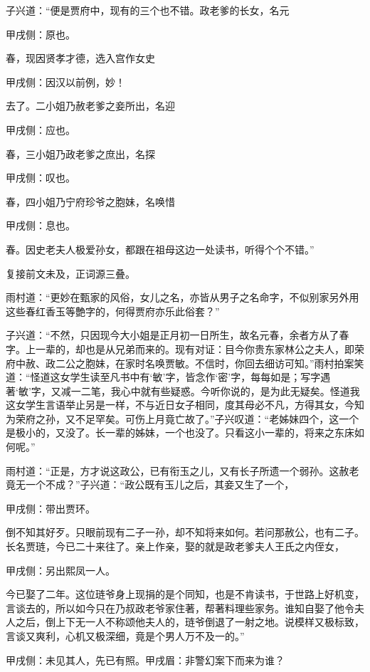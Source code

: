 \begin{parag}
    子兴道：“便是贾府中，现有的三个也不错。政老爹的长女，名元\begin{note}甲戌侧：原也。\end{note}春，现因贤孝才德，选入宫作女史\begin{note}甲戌侧：因汉以前例，妙！\end{note}去了。二小姐乃赦老爹之妾所出，名迎\begin{note}甲戌侧：应也。\end{note}春，三小姐乃政老爹之庶出，名探\begin{note}甲戌侧：叹也。\end{note}春，四小姐乃宁府珍爷之胞妹，名唤惜\begin{note}甲戌侧：息也。\end{note}春。因史老夫人极爱孙女，都跟在祖母这边一处读书，听得个个不错。”\begin{note}复接前文未及，正词源三叠。\end{note}雨村道：“更妙在甄家的风俗，女儿之名，亦皆从男子之名命字，不似别家另外用这些春红香玉等艶字的，何得贾府亦乐此俗套？”
\end{parag}


\begin{parag}
    子兴道：“不然，只因现今大小姐是正月初一日所生，故名元春，余者方从了春字。上一辈的，却也是从兄弟而来的。现有对证：目今你贵东家林公之夫人，即荣府中赦、政二公之胞妹，在家时名唤贾敏。不信时，你回去细访可知。”雨村拍案笑道：“怪道这女学生读至凡书中有‘敏’字，皆念作‘密’字，每每如是；写字遇著‘敏’字，又减一二笔，我心中就有些疑惑。今听你说的，是为此无疑矣。怪道我这女学生言语举止另是一样，不与近日女子相同，度其母必不凡，方得其女，今知为荣府之孙，又不足罕矣。可伤上月竟亡故了。”子兴叹道：“老姊妹四个，这一个是极小的，又没了。长一辈的姊妹，一个也没了。只看这小一辈的，将来之东床如何呢。”
\end{parag}


\begin{parag}
    雨村道：“正是，方才说这政公，已有衔玉之儿，又有长子所遗一个弱孙。这赦老竟无一个不成？”子兴道：“政公既有玉儿之后，其妾又生了一个，\begin{note}甲戌侧：带出贾环。\end{note}倒不知其好歹。只眼前现有二子一孙，却不知将来如何。若问那赦公，也有二子。长名贾琏，今已二十来往了。亲上作亲，娶的就是政老爹夫人王氏之内侄女，\begin{note}甲戌侧：另出熙凤一人。\end{note}今已娶了二年。这位琏爷身上现捐的是个同知，也是不肯读书，于世路上好机变，言谈去的，所以如今只在乃叔政老爷家住著，帮著料理些家务。谁知自娶了他令夫人之后，倒上下无一人不称颂他夫人的，琏爷倒退了一射之地。说模样又极标致，言谈又爽利，心机又极深细，竟是个男人万不及一的。”\begin{note}甲戌侧：未见其人，先已有照。甲戌眉：非警幻案下而来为谁？\end{note}
\end{parag}


